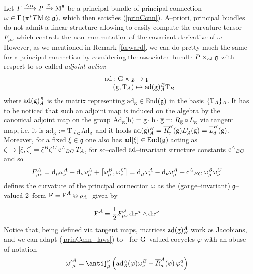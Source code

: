 Let $P\xrightarrow{\vartriangleleft_{\text{\normalfont G}}}P\xrightarrow{\pi}\text{\normalfont M}^n$ be a principal bundle of principal connection $\omega\in\Gamma\left(\pi^*T\text{\normalfont M}\otimes\mathfrak{g}\right)$, which then satisfies (\ref{prinConn}). A--priori, principal bundles do not admit a linear structure allowing to easily compute the curvature tensor $F_{\mu\nu}$ which controls the non--commutation of the covariant derivative of $\omega$. However, as we mentioned in Remark \ref{forward}, we can do pretty much the same for a principal connection by considering the associated bundle $P\times_{\text{\normalfont ad}}\mathfrak{g}$ with respect to so--called \emph{adjoint action}
$$\begin{matrix}
    \text{\normalfont ad}:\text{\normalfont G}\times\mathfrak{g}\to\mathfrak{g}\\
    \qquad\qquad\quad (\text{\normalfont g},\text{\normalfont T}_A)\mapsto\text{\normalfont ad}(\text{\normalfont g})_A^B\text{\normalfont T}_B
\end{matrix}$$
where $\text{\normalfont ad}(\text{\normalfont g})_A^B$ is the matrix representing $\text{\normalfont ad}_{\text{\normalfont g}}\in\text{\normalfont End}(\mathfrak{g})$ in the basis $\{\text{\normalfont T}_A\}_A$. It has to be noticed that such an adjoint map is induced on the algebra by the canonical adjoint map on the group $\text{\normalfont Ad}_{\text{\normalfont g}}(\text{\normalfont h})=\text{\normalfont g}\cdot\text{\normalfont h}\cdot\overline{\text{\normalfont g}}=:R_{\overline{\text{\normalfont g}}}\circ L_{\text{\normalfont g}}$ via tangent map, i.e. it is $\text{\normalfont ad}_{\text{\normalfont g}}:=\text{\normalfont T}_{\text{\normalfont id}_{\text{\normalfont G}}}\text{\normalfont Ad}_{\text{\normalfont g}}$ and it holds $\text{\normalfont ad}(\text{\normalfont g})_A^B=\overline{R}^B_c(\text{\normalfont g})L_A^c(\text{\normalfont g})=\overline{L}^B_d(\text{\normalfont g})$.\, Moreover, for a fixed $\xi\in\mathfrak{g}$ one also has $\text{\normalfont ad}[\xi]\in\text{\normalfont End}(\mathfrak{g})$ acting as $\zeta\mapsto[\xi,\zeta]=\xi^B\zeta^C\,{\text{\normalfont c}^A}_{BC}\,T_A$, for so--called $\text{\normalfont ad}$--invariant structure constants ${\text{\normalfont c}^A}_{BC}$ and so 
$$F_{\mu\nu}^A=\text{\normalfont d}_\mu\omega^A_\nu-\text{\normalfont d}_\nu\omega_\mu^A+\left[\omega^B_\mu,\omega^C_\nu\right]=\text{\normalfont d}_\mu\omega^A_\nu-\text{\normalfont d}_\nu\omega_\mu^A+{\text{\normalfont c}^A}_{BC}\,\omega^B_\mu\omega^C_\nu$$
defines the curvature of the principal connection $\omega$ as the (gauge--invariant) $\mathfrak{g}$--valued 2--form $\text{\normalfont F}=\text{\normalfont F}^A\otimes\rho_A$%
\,\,given by

\begin{equation}\label{princ_curv}
    \text{\normalfont F}^A=\frac{1}{2}F^A_{\mu\nu}\,\text{\normalfont d} x^\mu\wedge\text{\normalfont d} x^\nu
\end{equation}
Notice that, being defined via tangent maps, matrices $\text{\normalfont ad}(\text{\normalfont g})^A_B$ work as Jacobians, and we can adapt (\ref{prinConn_laws}) to---for $\text{\normalfont G}$--valued cocycles $\varphi$ with an abuse of notation
\begin{equation}\label{princ_conn_transf_ad}
    {\omega'}^A_\mu=\antij^\nu_\mu\left(\ad^A_B(\varphi)\omega^B_\nu-\overline{R}^A_a(\varphi)\,\varphi^a_\nu\right)
\end{equation}

